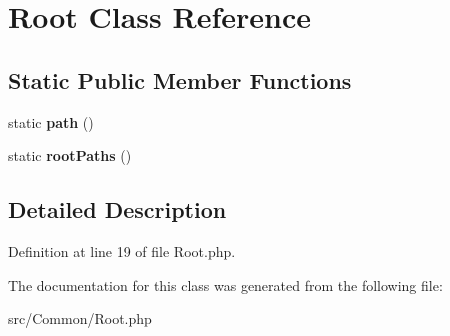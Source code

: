 \hypertarget{class_zest_1_1_common_1_1_root}{}\section{Root Class Reference}
\label{class_zest_1_1_common_1_1_root}
\subsection*{Static Public Member Functions}
\begin{DoxyCompactItemize}
\item 
\mbox{\label{class_zest_1_1_common_1_1_root_acb51847ab35bc5c9aa255f1f529b9619}} 
static {\bfseries path} ()
\item 
\mbox{\label{class_zest_1_1_common_1_1_root_a68cd1cb538f670ad4c924f1148c5f586}} 
static {\bfseries root\+Paths} ()
\end{DoxyCompactItemize}


\subsection{Detailed Description}


Definition at line 19 of file Root.\+php.



The documentation for this class was generated from the following file\+:\begin{DoxyCompactItemize}
\item 
src/\+Common/Root.\+php\end{DoxyCompactItemize}
